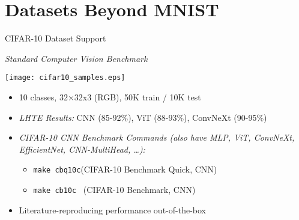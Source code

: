 \section[toc={New Dataset Formats}]{Datasets Beyond MNIST}

\begin{slide}[\slideopts,toc={CIFAR-10}]{CIFAR-10 Dataset Support}

  \vspace{-1em}
  
  \emph{Standard Computer Vision Benchmark}

  \vspace{0.5em}

    \texttt{[image: cifar10\_samples.eps]}
  
  \vspace{-0.5em}

  \begin{itemize}
    \item 10 classes, 32×32x3 (RGB), 50K train / 10K test
    
    \item \emph{LHTE Results:} CNN (85-92\%), ViT (88-93\%), ConvNeXt (90-95\%)
    
    \item \emph{CIFAR-10 CNN Benchmark Commands (also have MLP, ViT, ConvNeXt, EfficientNet, CNN-MultiHead, \ldots):}
      \begin{itemize}
        \item \texttt{make cbq10c}\quad (CIFAR-10 Benchmark Quick, CNN)
        \item \texttt{make cb10c} \quad\, (CIFAR-10 Benchmark, CNN)
      \end{itemize}
    \item Literature-reproducing performance out-of-the-box
  \end{itemize}
  
\end{slide}

